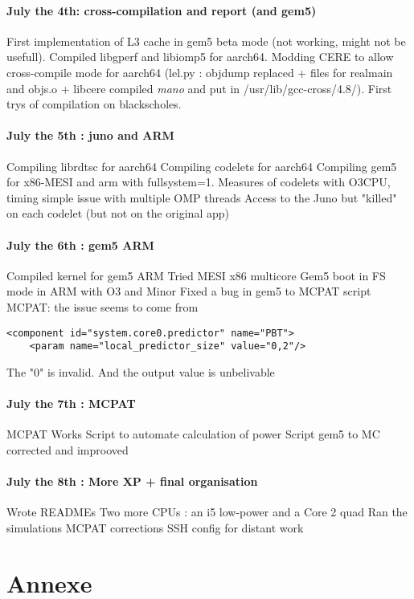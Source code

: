 \documentclass{article}
\begin{document}
\paragraph{July the 4th: cross-compilation and report (and gem5)}
First implementation of L3 cache in gem5 beta mode (not working, might not be usefull).
Compiled libgperf and libiomp5 for aarch64.
Modding CERE to allow cross-compile mode for aarch64 (lel.py : objdump replaced + files for realmain and objs.o + libcere compiled \textit{mano} and put in /usr/lib/gcc-cross/4.8/).
First trys of compilation on blackscholes.

\paragraph{July the 5th : juno and ARM}
Compiling librdtsc for aarch64
Compiling codelets for aarch64
Compiling gem5 for x86-MESI and arm with fullsystem=1.
Measures of codelets with O3CPU, timing simple issue with multiple OMP threads
Access to the Juno but "killed" on each codelet (but not on the original app)

\paragraph{July the 6th : gem5 ARM}
Compiled kernel for gem5 ARM
Tried MESI x86 multicore
Gem5 boot in FS mode in ARM with O3 and Minor
Fixed a bug in gem5 to MCPAT script
MCPAT: the issue seems to come from
\begin{lstlisting}
<component id="system.core0.predictor" name="PBT"> 
	<param name="local_predictor_size" value="0,2"/>
\end{lstlisting}
The "0" is invalid.
And the output value is unbelivable

\paragraph{July the 7th : MCPAT}
MCPAT Works
Script to automate calculation of power
Script gem5 to MC corrected and improoved

\paragraph{July the 8th : More XP + final organisation}
Wrote READMEs
Two more CPUs : an i5 low-power and a Core 2 quad
Ran the simulations
MCPAT corrections
SSH config for distant work


\section*{Annexe}
\end{document}
